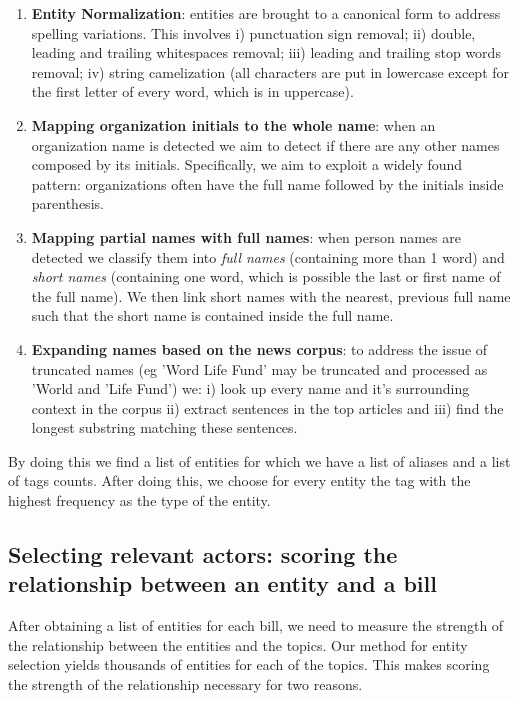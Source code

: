 \begin{enumerate}

\item \textbf{Entity Normalization}: entities are brought to a canonical form to address spelling variations. This involves i) punctuation sign removal; ii) double, leading and trailing whitespaces removal; iii) leading and trailing stop words removal; iv) string camelization (all characters are put in lowercase except for the first letter of every word, which is in uppercase). 

\item \textbf{Mapping organization initials to the whole name}: when an organization name is detected we aim to detect if there are any other names composed by its initials. Specifically, we aim to exploit a widely found pattern: organizations often have the full name followed by the initials inside parenthesis. 

\item \textbf{Mapping partial names with full names}: when person names are detected we classify them into \emph{full names} (containing more than 1 word) and \emph{short names} (containing one word, which is possible the last or first name of the full name). We then link short names with the nearest, previous full name such that the short name is contained inside the full name.

\item \textbf{Expanding names based on the news corpus}: to address the issue of truncated names (eg 'Word Life Fund' may be truncated and processed as 'World and 'Life Fund')  we: i) look up every name and it's surrounding context in the corpus ii) extract sentences in the top articles and iii) find the longest substring matching these sentences. 
\end{enumerate}

By doing this we find a list of entities for which we have a list of aliases and a list of tags counts. After doing this, we choose for every entity the tag with the highest frequency as the type of the entity. \\

\subsection{Selecting relevant actors: scoring the relationship between an entity and a bill}\label{subsec:entity-bill-score}

After obtaining a list of entities for each bill, we need to measure the strength of the relationship between the entities and the topics. Our method for entity selection yields thousands of entities for each of the topics. This makes scoring the strength of the relationship necessary for two reasons.\\ 

